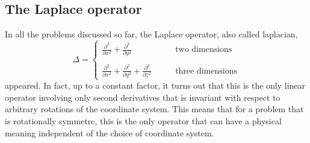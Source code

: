 \subsection{The Laplace operator\label{beispiele:laplaceoperator}}
In all the problems discussed so far, the Laplace operator,
also called laplacian,
\[
\Delta
=
\begin{cases}
\displaystyle
\frac{\partial^2}{\partial x^2}
+\frac{\partial^2}{\partial y^2}&\qquad\text{two dimensions}\\
\\
\displaystyle
\frac{\partial^2}{\partial x^2}
+\frac{\partial^2}{\partial y^2}
+\frac{\partial^2}{\partial z^2}&\qquad\text{three dimensions}
\end{cases}
\]
appeared.
In fact, up to a constant factor, it turns out that this is the only
linear operator involving only second derivatives that is invariant
with respect to arbitrary rotations of the coordinate system.
This means that for a problem that is rotationally symmetrc, this is
the only operator that can have a physical meaning independent
of the choice of coordinate system.

